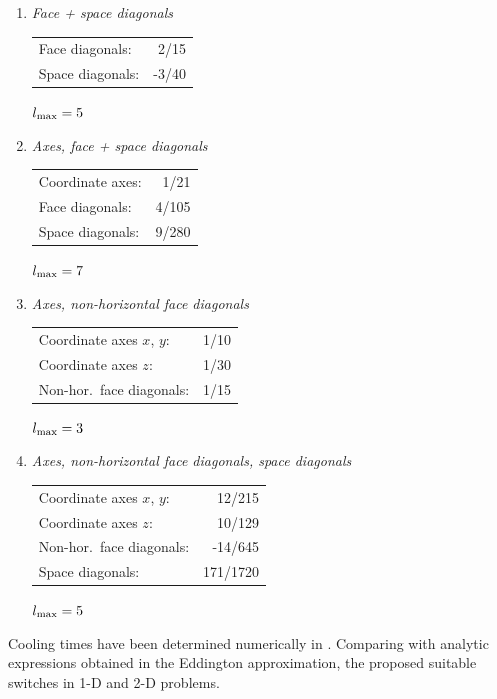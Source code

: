 \documentclass[\mydriver,12pt,twoside,notitlepage,a4paper]{article}
\begin{document}
{\begin{enumerate}
  $l_{\rm max} = 5$

\item \emph{Face + space diagonals}

  \begin{tabular}{@{}lr}
    Face diagonals:  &  2/15 \\
    Space diagonals: & -3/40 \\
  \end{tabular}

  $l_{\rm max} = 5$

\item \emph{Axes, face + space diagonals}

  \begin{tabular}{@{}lr}
    Coordinate axes: & 1/21 \\
    Face diagonals:  & 4/105 \\
    Space diagonals: & 9/280 \\
  \end{tabular}

  $l_{\rm max} = 7$

\item \emph{Axes, non-horizontal face diagonals}

  \begin{tabular}{@{}lr}
    Coordinate axes $x$, $y$: & 1/10 \\
    Coordinate axes $z$:      & 1/30 \\
    Non-hor.~face diagonals:  & 1/15 \\
  \end{tabular}

  $l_{\rm max} = 3$

\item \emph{Axes, non-horizontal face diagonals, space diagonals}

  \begin{tabular}{@{}lr}
    Coordinate axes $x$, $y$: & 12/215 \\
    Coordinate axes $z$:      & 10/129 \\
    Non-hor.~face diagonals:  & -14/645 \\
    Space diagonals:          & 171/1720 \\
  \end{tabular}

  $l_{\rm max} = 5$

\end{enumerate}
}

Cooling times have been determined numerically in \cite{BB14}.
Comparing with analytic expressions obtained in the Eddington
approximation, the proposed suitable switches in 1-D and 2-D problems.
\end{document}
